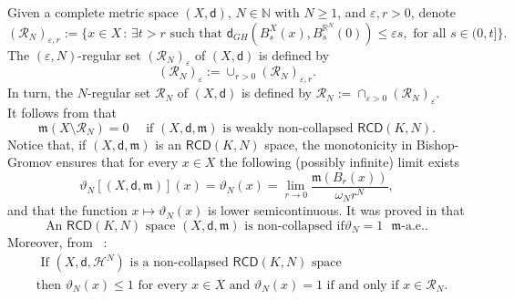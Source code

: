 \documentclass[a4paper]{amsart}
\theoremstyle{plain}
\theoremstyle{definition}
\numberwithin{equation}{section}
\newcommand{\R}{\mathbb{R}}
\newcommand{\N}{\mathbb{N}}
\newcommand{\RCD}{\mathsf{RCD}}
\newcommand{\mm}{\mathfrak m}
\newcommand{\sfd}{\mathsf d}
\newcommand{\cR}{\mathcal{R}}
\newcommand{\cH}{\mathcal{H}}
\begin{document}
{Given a complete metric space $(X,\sfd)$, $N\in \N$ with $N\geq 1$, and  $\varepsilon, r>0$, denote
\begin{equation}\label{eq:defRNepsr}
(\cR_{N})_{\varepsilon, r}:=\{x\in X\,:\, \exists t>r \text{ such that } \sfd_{GH}(B_{s}^{X}(x), B_{s}^{\R^{N}}(0))\leq \varepsilon s, \text{ for all }s\in(0,t] \}.
\end{equation}
The $(\varepsilon,N)$-regular set  $(\cR_{N})_{\varepsilon}$ of $(X,\sfd)$ is defined by 
\begin{equation}\label{eq:defRNeps}
(\cR_{N})_{\varepsilon}:=\cup_{r>0} (\cR_{N})_{\varepsilon, r}.
\end{equation}
In turn, the  $N$-regular set  $\cR_{N}$ of $(X,\sfd)$ is defined by $\cR_{N}:=\cap_{\varepsilon>0} (\cR_{N})_{\varepsilon}$.
\\{ It follows from \cite{MN} that 
\begin{equation}\label{eq:RNfullMeas}
\mm(X\setminus \cR_{N})=0 \quad \text{ if  $(X,\sfd,\mm)$ is weakly non-collapsed $\RCD(K,N)$.}
\end{equation}}
Notice that, if $(X,\sfd,\mm)$  is an $\RCD(K,N)$ space,  the monotonicity in Bishop-Gromov ensures that for every $x\in X$ the following (possibly infinite)  limit exists 
\begin{equation}\label{eq:defthetaN}
\vartheta_{N}[(X,\sfd,\mm)](x)=\vartheta_{N}(x)=\lim_{r\to 0} \frac{\mm(B_{r}(x))}{\omega_{N} r^{N}},
\end{equation}
{and that the function $x\mapsto \vartheta_{N}(x)$ is lower semicontinuous.}
It was  proved in \cite{GDPNonColl} that 
\begin{equation}\label{noncoll-density-1}
\text{An $\RCD(K,N)$ space $(X, \sfd , \mm)$ is non-collapsed if
$\vartheta_N=1$ $\mm$-a.e..} 
\end{equation}
Moreover, from ~\cite[Corollary 1.7]{GDPNonColl}:
\begin{equation}\label{eq:RegSetDens}
\begin{split}
 &\text{ If $(X,\sfd,\cH^{N})$ is a non-collapsed $\RCD(K,N)$ space } \\
& \text{then  $\vartheta_{N}(x) \leq 1$ for every $x\in X$ and  $\vartheta_N(x) = 1$ if and only if $x\in {\mathcal R}_{N}$.}
 \end{split}
\end{equation} 

}
\end{document}
